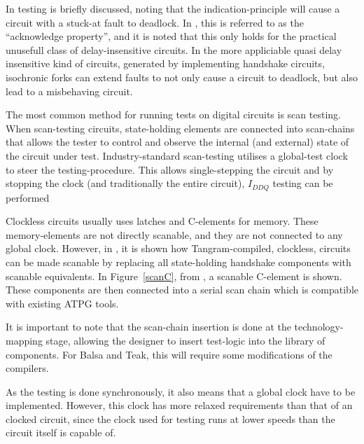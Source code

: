 In \cite[pp. 27-28]{sparso} testing is briefly discussed, noting that
the indication-principle will cause a circuit with a stuck-at fault to
deadlock. In \cite[pp. 26]{fullscan}, this is referred to as the
``acknowledge property'', and it is noted that this only holds for the
practical unusefull class of delay-insensitive circuits. In the more
appliciable quasi delay insensitive kind of circuits, generated by
implementing handshake circuits, isochronic forks can extend faults to
not only cause a circuit to deadlock, but also lead to a misbehaving
circuit.

The most common method for running tests on digital circuits is
scan testing. When scan-testing circuits, state-holding elements are
connected into scan-chains that allows the tester to control and
observe the internal (and external) state of the circuit under
test. Industry-standard scan-testing utilises a global-test clock to
steer the testing-procedure. This allows single-stepping the circuit
and by stopping the clock (and traditionally the entire circuit),
$I_{DDQ}$ testing can be performed

Clockless circuits usually uses latches and C-elements for
memory. These memory-elements are not directly scanable, and they are
not connected to any global clock. However, in \cite{fullscan}, it is
shown how Tangram-compiled, clockless, circuits can be made scanable
by replacing all state-holding handshake components with scanable
equivalents. In Figure~\ref{scanC}, from \cite{fullscan}, a scanable
C-element is shown. These components are then connected into a serial
scan chain which is compatible with existing ATPG tools.

It is important to note that the scan-chain insertion is done at the
technology-mapping stage, allowing the designer to insert test-logic
into the library of components. For Balsa and Teak, this will require
some modifications of the compilers.

As the testing is done synchronously, it also means that a global
clock have to be implemented. However, this clock has more relaxed
requirements than that of an clocked circuit, since the clock used for
testing runs at lower speeds than the circuit itself is capable of.

